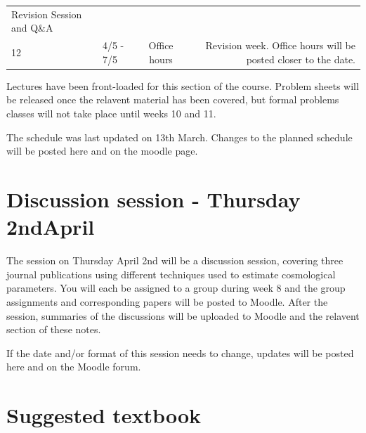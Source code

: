 \documentclass[11pt,a4paper]{book}
\begin{document}
\begin{longtable}[]{@{}llcr@{}}
\begin{minipage}[t]{0.55\columnwidth}
Revision Session and Q\&A\strut
\end{minipage}\tabularnewline
\begin{minipage}[t]{0.05\columnwidth}\raggedright
12\strut
\end{minipage} & \begin{minipage}[t]{0.09\columnwidth}\raggedright
4/5 - 7/5\strut
\end{minipage} & \begin{minipage}[t]{0.19\columnwidth}\centering
Office hours\strut
\end{minipage} & \begin{minipage}[t]{0.55\columnwidth}\raggedleft
Revision week. Office hours will be posted closer to the date.\strut
\end{minipage}\tabularnewline
\bottomrule
\end{longtable}

Lectures have been front-loaded for this section of the course. Problem sheets will be released once the relavent material has been covered, but formal problems classes will not take place until weeks 10 and 11.

The schedule was last updated on 13th March. Changes to the planned schedule will be posted here and on the moodle page.

\hypertarget{discussion-session---thursday-2ndapril}{%
\section*{Discussion session - Thursday 2ndApril}\label{discussion-session---thursday-2ndapril}}

The session on Thursday April 2nd will be a discussion session, covering three journal publications using different techniques used to estimate cosmological parameters. You will each be assigned to a group during week 8 and the group assignments and corresponding papers will be posted to Moodle. After the session, summaries of the discussions will be uploaded to Moodle and the relavent section of these notes.

If the date and/or format of this session needs to change, updates will be posted here and on the Moodle forum.

\hypertarget{suggested-textbook}{%
\section*{Suggested textbook}\label{suggested-textbook}}
\end{document}
